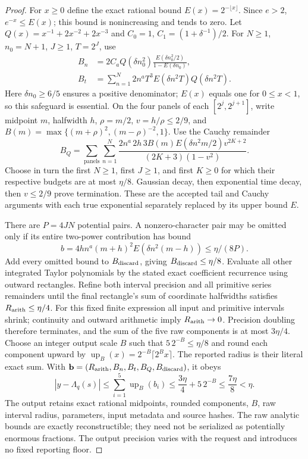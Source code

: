 \documentclass[11pt,oneside,openany]{book}
\theoremstyle{definition}\newtheorem{definition}[theorem]{Definition}
\theoremstyle{remark}\newtheorem{remark}[theorem]{Remark}
\begin{document}
\begin{proof}
For $x\ge0$ define the exact rational bound $E(x)=2^{-\lfloor x\rfloor}$.
Since $e>2$, $e^{-x}\le E(x)$; this bound is nonincreasing and tends to zero.
Let $Q(x)=x^{-1}+2x^{-2}+2x^{-3}$ and
$C_0=1$, $C_1=(1+\delta^{-1})/2$.
For $N\ge1$, $n_0=N+1$, $J\ge1$, $T=2^J$, use
\begin{align*}
 B_n&=2C_aQ(\delta n_0^2)
       \frac{E(\delta n_0^2/2)}{1-E(\delta n_0)},\\
 B_t&=\sum_{n=1}^N2n^aT^3E(\delta n^2T)Q(\delta n^2T).
\end{align*}
Here $\delta n_0\ge6/5$ ensures a positive denominator; $E(x)$ equals
one for $0\le x<1$, so this safeguard is essential.
On the four panels of each $[2^j,2^{j+1}]$, write midpoint $m$,
halfwidth $h$, $\rho=m/2$, $v=h/\rho\le2/9$,
and $B(m)=\max\{(m+\rho)^2,(m-\rho)^{-2},1\}$.
Use the Cauchy remainder
\[
 B_Q=\sum_{\mathrm{panels}}\sum_{n=1}^N
 \frac{2n^a\,2h\,3B(m)E(\delta n^2m/2)v^{2K+2}}
 {(2K+3)(1-v^2)}.
\]
Choose in turn the first $N\ge1$, first $J\ge1$, and first $K\ge0$
for which their respective budgets are at most $\eta/8$.
Gaussian decay, then exponential time decay, then $v\le2/9$ prove
termination. These are the accepted tail and Cauchy arguments with each
true exponential separately replaced by its upper bound $E$.

There are $P=4JN$ potential pairs. A nonzero-character pair may be
omitted only if its entire two-power contribution has bound
\[
 b=4hn^a(m+h)^2E(\delta n^2(m-h))\le\eta/(8P).
\]
Add every omitted bound to $B_{\rm discard}$, giving
$B_{\rm discard}\le\eta/8$.
Evaluate all other integrated Taylor polynomials by the stated exact
coefficient recurrence using outward rectangles. Refine both interval
precision and all primitive series remainders until the final rectangle's
sum of coordinate halfwidths satisfies $R_{\rm arith}\le\eta/4$.
For this fixed finite expression all input and primitive intervals shrink;
continuity and outward arithmetic imply $R_{\rm arith}\to0$.
Precision doubling therefore terminates, and the sum of the five raw
components is at most $3\eta/4$.
Choose an integer output scale $B$ such that $5\,2^{-B}\le\eta/8$ and
round each component upward by
$\operatorname{up}_B(x)=2^{-B}\lceil2^Bx\rceil$.
The reported radius is their literal exact sum. With
$\mathbf b=(R_{\rm arith},B_n,B_t,B_Q,B_{\rm discard})$, it obeys
\[
 |y-\Lambda_q(s)|\le\sum_{i=1}^5\operatorname{up}_B(b_i)
 \le\frac{3\eta}{4}+5\,2^{-B}\le\frac{7\eta}{8}<\eta.
\]
The output retains exact rational midpoints, rounded components, $B$,
raw interval radius, parameters, input metadata and source hashes.
The raw analytic bounds are exactly reconstructible; they need not be
serialized as potentially enormous fractions. The output precision varies
with the request and introduces no fixed reporting floor.
\end{proof}
\end{document}

